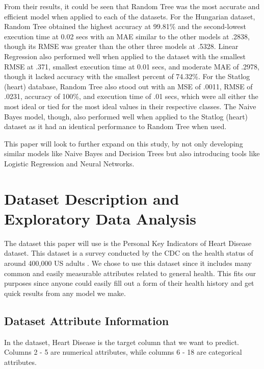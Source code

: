 \documentclass[a4paper]{article}
\begin{document}
From their results, it could be seen that Random Tree was the most accurate and efficient model when applied to each of the datasets. For the Hungarian dataset, Random Tree obtained the highest accuracy at 99.81\% and the second-lowest execution time at 0.02 secs with an MAE similar to the other models at .2838, though its RMSE was greater than the other three models at .5328. Linear Regression also performed well when applied to the dataset with the smallest RMSE at .371, smallest execution time at 0.01 secs, and moderate MAE of .2978, though it lacked accuracy with the smallest percent of 74.32\%. For the Statlog (heart) database, Random Tree also stood out with an MSE of .0011, RMSE of .0231, accuracy of 100\%, and execution time of .01 secs, which were all either the most ideal or tied for the most ideal values in their respective classes. The Naive Bayes model, though, also performed well when applied to the Statlog (heart) dataset as it had an identical performance to Random Tree when used.   

This paper will look to further expand on this study, by not only developing similar models like Naive Bayes and Decision Trees but also introducing tools like Logistic Regression and Neural Networks. 


\section{Dataset Description and Exploratory Data Analysis}

The dataset this paper will use is the Personal Key Indicators of Heart Disease dataset. This dataset is a survey conducted by the CDC on the health status of around 400,000 US adults \cite{dataset}. We chose to use this dataset since it includes many common and easily measurable attributes related to general health. This fits our purposes since anyone could easily fill out a form of their health history and get quick results from any model we make.

\subsection{Dataset Attribute Information}

In the dataset, Heart Disease is the target column that we want to predict. Columns 2 - 5 are numerical attributes, while columns 6 - 18 are categorical attributes.
\end{document}
